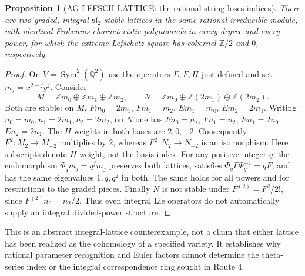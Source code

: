 \documentclass[11pt,a4paper]{article}
\newtheorem{proposition}{Proposition}
\begin{document}
\begin{proposition}[AG-LEFSCH-LATTICE: the rational string loses indices]
There are two graded, integral $\mathfrak{sl}_2$-stable lattices
in the same rational irreducible module, with identical
Frobenius characteristic polynomials in every degree and every
power, for which the extreme Lefschetz square has cokernel
$\mathbb Z/2$ and $0$, respectively.
\end{proposition}
\begin{proof}
On $V=\operatorname{Sym}^2(\mathbb Q^2)$ use the operators
$E,F,H$ just defined and set $m_j=x^{2-j}y^j$. Consider
\[
 M=\mathbb Zm_0\oplus\mathbb Zm_1\oplus\mathbb Zm_2,
 \qquad
 N=\mathbb Zm_0\oplus\mathbb Z(2m_1)\oplus\mathbb Z(2m_2).
\]
Both are stable: on $M$,
$Fm_0=2m_1$, $Fm_1=m_2$,
$Em_1=m_0$, $Em_2=2m_1$.
Writing $n_0=m_0,n_1=2m_1,n_2=2m_2$, on $N$ one has
$Fn_0=n_1$, $Fn_1=n_2$,
$En_1=2n_0$, $En_2=2n_1$.
The $H$-weights in both bases are $2,0,-2$.
Consequently $F^2:M_2\to M_{-2}$ multiplies by $2$,
whereas $F^2:N_2\to N_{-2}$ is an isomorphism.
Here subscripts denote $H$-weight, not the basis index.
For any positive integer $q$, the endomorphism
$\Phi_qm_j=q^jm_j$ preserves both lattices, satisfies
$\Phi_qF\Phi_q^{-1}=qF$, and has the same eigenvalues
$1,q,q^2$ in both. The same holds for all powers and for
restrictions to the graded pieces. Finally $N$ is not stable
under $F^{(2)}=F^2/2!$, since $F^{(2)}n_0=n_2/2$.
Thus even integral Lie operators do not automatically supply
an integral divided-power structure.
\end{proof}

This is an abstract integral-lattice counterexample, not a claim
that either lattice has been realized as the cohomology of a
specified variety. It establishes why rational parameter
recognition and Euler factors cannot determine the theta-series
index or the integral correspondence ring sought in Route 4.
\end{document}
